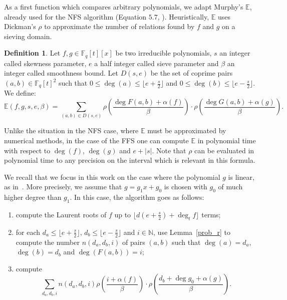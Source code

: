 \documentclass[a4wide]{article}
\newcommand{\F}{{\mathbb F}}
\newcommand{\N}{{\mathbb N}}
\theoremstyle{plain}
\theoremstyle{definition}
\newtheorem{deff}[theo]{Definition}
\theoremstyle{remark}
\begin{document}
As a first function which compares arbitrary polynomials, we adapt Murphy's
$\mathbb{E}$, already used for the NFS algorithm (Equation $5.7$, \cite{Mur99}). Heuristically, $\mathbb{E}$
uses Dickman's $\rho$ to approximate the
number of relations found by $f$ and $g$ on a sieving domain.
\begin{deff}
Let $f,g\in \F_q[t][x]$ be two irreducible polynomials, $s$ an integer
called skewness parameter, $e$ a half integer called sieve parameter and $\beta$
an integer called smoothness bound. Let $D(s,e)$ be the set of coprime pairs
 $(a,b)\in \F_q[t]^2$ such that $0\leq \deg(a)\leq \lfloor
 e+\frac{s}{2}\rfloor$ and $0\leq
\deg(b)\leq \lfloor e-\frac{s}{2} \rfloor$. We define:
\begin{equation*}
	\mathbb{E}(f,g,s,e,\beta)=\sum_{(a,b)\in D(s,e)}
	\rho\left(\frac{\deg F(a,b)+\alpha(f)}{\beta}\right)\cdot
	\rho\left(\frac{\deg G(a,b)+\alpha(g)}{\beta}\right).
\end{equation*}

\end{deff}

Unlike the situation in the NFS case, where $\mathbb{E}$ must be approximated by
numerical methods, in the case of the FFS one can compute $\mathbb{E}$ in
polynomial time with respect to $\deg(f)$, $\deg(g)$ and $e+|s|$. Note that $\rho$ can
be evaluated in polynomial time to any precision on the interval which is
relevant in this formula. 

We recall that we focus in this work on the case where the
polynomial $g$ is linear, as in~\cite{JoLe02}. More precisely, we assume
that $g=g_1x+g_0$ is chosen with $g_0$ of much higher
degree than $g_1$. In this case, the algorithm goes as follows:
\begin{enumerate}
	\item[1.] compute the Laurent roots of $f$ up to
		$\lfloor d(e+\frac{s}{2})+\deg_t f\rfloor$ terms;
	\item[2.] for each $d_a\leq \lfloor e+\frac{s}{2}\rfloor$,
		$d_b\leq \lfloor e-\frac{s}{2} \rfloor$ and $i\in\N$, use
		Lemma~\ref{prob_r} to compute the number $n(d_a,d_b,i)$ of pairs
$(a,b)$ such that $\deg(a)=d_a$, $\deg(b)=d_b$ and $\deg(F(a,b))=i$;
\item[3.] compute 
	\begin{equation}
	 \sum_{d_a,d_b,i}n(d_a,d_b,i)\rho\left(\frac{i+\alpha(f)}{\beta}\right)
	 \cdot\rho\left(\frac{d_b+\deg
	 g_0+\alpha(g)}{\beta}\right).
	\end{equation}
\end{enumerate}
\end{document}
